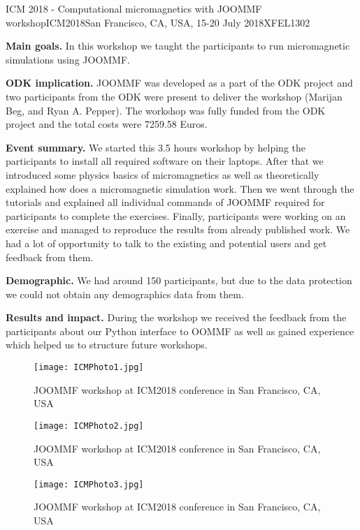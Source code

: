 \begin{event}{ICM 2018 - Computational micromagnetics with JOOMMF workshop}{ICM2018}{San Francisco, CA, USA, 15-20 July 2018}{XFEL}{130}{2}{}

\textbf{Main goals.} In this workshop we taught the participants to run micromagnetic simulations using JOOMMF.

\textbf{ODK implication.} JOOMMF was developed as a part of the ODK project and two participants from the ODK were present to deliver the workshop (Marijan Beg, and Ryan A. Pepper). The workshop was fully funded from the ODK project and the total costs were 7259.58 Euros.

\textbf{Event summary.} We started this 3.5 hours workshop by helping the participants to install all required software on their laptops. After that we introduced some physics basics of micromagnetics as well as theoretically explained how does a micromagnetic simulation work. Then we went through the tutorials and explained all individual commands of JOOMMF required for participants to complete the exercises. Finally, participants were working on an exercise and managed to reproduce the results from already published work. We had a lot of opportunity to talk to the existing and potential users and get feedback from them.

\textbf{Demographic.} We had around 150 participants, but due to the data protection we could not obtain any demographics data from them.

\textbf{Results and impact.} During the workshop we received the feedback from the participants about our Python interface to OOMMF as well as gained experience which helped us to structure future workshops.

\begin{figure}[ht]
\texttt{[image: ICMPhoto1.jpg]}
\caption*{JOOMMF workshop at ICM2018 conference in San Francisco, CA, USA}
\end{figure}

\begin{figure}[ht]
\texttt{[image: ICMPhoto2.jpg]}
\caption*{JOOMMF workshop at ICM2018 conference in San Francisco, CA, USA}
\end{figure}

\begin{figure}[ht]
\texttt{[image: ICMPhoto3.jpg]}
\caption*{JOOMMF workshop at ICM2018 conference in San Francisco, CA, USA}
\end{figure}

\end{event}
